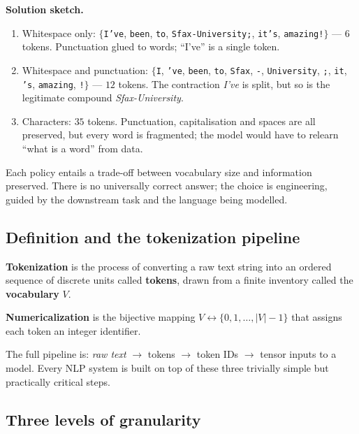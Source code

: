 \textbf{Solution sketch.}
\begin{enumerate}
    \item Whitespace only: $\{$\texttt{I've}, \texttt{been}, \texttt{to}, \texttt{Sfax-University;}, \texttt{it's}, \texttt{amazing!}$\}$ --- $6$ tokens. Punctuation glued to words; ``I've'' is a single token.
    \item Whitespace and punctuation: $\{$\texttt{I}, \texttt{'ve}, \texttt{been}, \texttt{to}, \texttt{Sfax}, \texttt{-}, \texttt{University}, \texttt{;}, \texttt{it}, \texttt{'s}, \texttt{amazing}, \texttt{!}$\}$ --- $12$ tokens. The contraction \emph{I've} is split, but so is the legitimate compound \emph{Sfax-University}.
    \item Characters: $35$ tokens. Punctuation, capitalisation and spaces are all preserved, but every word is fragmented; the model would have to relearn ``what is a word'' from data.
\end{enumerate}
Each policy entails a trade-off between vocabulary size and information preserved. There is no universally correct answer; the choice is engineering, guided by the downstream task and the language being modelled.

\subsection{Definition and the tokenization pipeline}

\begin{definition}[Tokenization]
\textbf{Tokenization} is the process of converting a raw text string into an ordered sequence of discrete units called \textbf{tokens}, drawn from a finite inventory called the \textbf{vocabulary} $V$.
\end{definition}

\begin{definition}[Numericalization]
\textbf{Numericalization} is the bijective mapping $V \leftrightarrow \{0, 1, \dots, |V|-1\}$ that assigns each token an integer identifier.
\end{definition}

The full pipeline is: \emph{raw text} $\to$ tokens $\to$ token IDs $\to$ tensor inputs to a model. Every NLP system is built on top of these three trivially simple but practically critical steps.

\subsection{Three levels of granularity}

